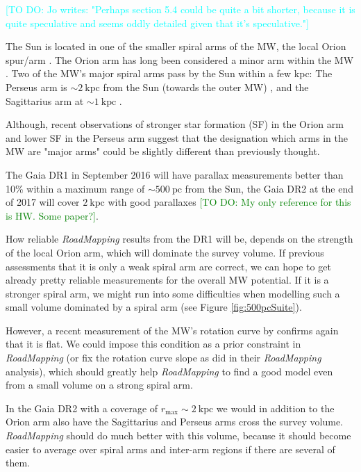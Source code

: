 \documentclass[iop,revtex4,numberedappendix,appendixfloats]{emulateapj}
\newcommand{\RM}{{\sl RoadMapping}}
\newcommand{\HW}[1]{\textcolor{Green}{#1}}
\newcommand{\Jo}[1]{\textcolor{Cyan}{#1}}
\begin{document}
\Jo{[TO DO: Jo writes: "Perhaps section 5.4 could be quite a bit shorter, because it is quite speculative and seems oddly detailed given that it's speculative."]}

The Sun is located in one of the smaller spiral arms of the MW, the local Orion spur/arm \citep{1953ApJ...118..318M}. The Orion arm has long been considered a minor arm within the MW \citep{1985IAUS..106..335B}. Two of the MW's major spiral arms pass by the Sun within a few kpc: The Perseus arm is $\sim2~\text{kpc}$ from the Sun (towards the outer MW) \citep{2006Sci...311...54X}, and the Sagittarius arm at $\sim1~\text{kpc}$ \citep{2010PASJ...62..287S}. 

Although, recent observations of stronger star formation (SF) in the Orion arm \citep{2013ApJ...769...15X} and lower SF in the Perseus arm \citep{2013ApJ...775...79Z} suggest that the designation which arms in the MW are "major arms" could be slightly different than previously thought.

The Gaia DR1 in September 2016 will have parallax measurements better than 10\% within a maximum range of $\sim 500~\text{pc}$ from the Sun, the Gaia DR2 at the end of 2017 will cover $2~\text{kpc}$ with good parallaxes \HW{[TO DO: My only reference for this is HW. Some paper?]}.

How reliable \RM{} results from the DR1 will be, depends on the strength of the local Orion arm, which will dominate the survey volume. If previous assessments that it is only a weak spiral arm are correct, we can hope to get already pretty reliable measurements for the overall MW potential. If it is a stronger spiral arm, we might run into some difficulties when modelling such a small volume dominated by a spiral arm (see Figure \ref{fig:500pcSuite}).

However, a recent measurement of the MW's rotation curve by \citet{2014ApJ...783..130R} confirms again that it is flat. We could impose this condition as a prior constraint in \RM{} (or fix the rotation curve slope as \citet{2013ApJ...779..115B} did in their \RM{} analysis), which should greatly help \RM{} to find a good model even from a small volume on a strong spiral arm. 

In the Gaia DR2 with a coverage of $r_\text{max}\sim2~\text{kpc}$ we would in addition to the Orion arm also have the Sagittarius and Perseus arms cross the survey volume. \RM{} should do much better with this volume, because it should become easier to average over spiral arms and inter-arm regions if there are several of them.
\end{document}
